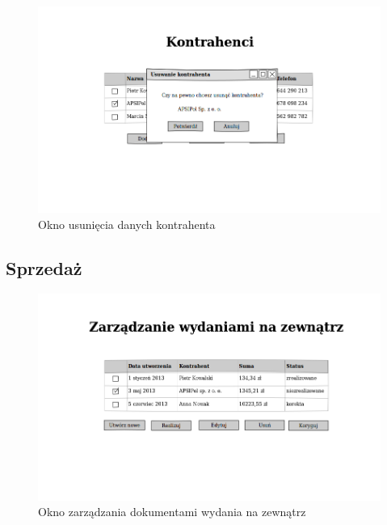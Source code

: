 \begin{figure}[!htb]
  \begin{center}
    \includegraphics[scale=0.45]{../img/interfejs/usuwanie-danych-kontrahenta.png}
  \end{center}
  \caption{Okno usunięcia danych kontrahenta}
\end{figure}
\FloatBarrier

\subsection{Sprzedaż}

\begin{figure}[!htb]
  \begin{center}
    \includegraphics[scale=0.45]{../img/interfejs/zarzadzanie-dokumentami-WZ.png}
  \end{center}
  \caption{Okno zarządzania dokumentami wydania na zewnątrz}
\end{figure}
\FloatBarrier

